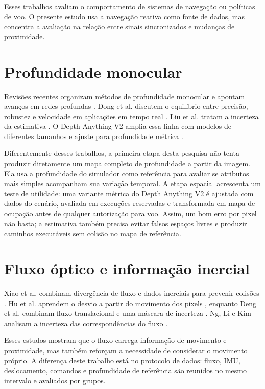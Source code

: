 Esses trabalhos avaliam o comportamento de sistemas de navegação ou políticas de voo. O presente estudo usa a navegação reativa como fonte de dados, mas concentra a avaliação na relação entre sinais sincronizados e mudanças de proximidade.

\section{Profundidade monocular}

Revisões recentes organizam métodos de profundidade monocular e apontam avanços em redes profundas \cite{Vyas2022,Arampatzakis2024,Dhanushkodi2025}. Dong et al. discutem o equilíbrio entre precisão, robustez e velocidade em aplicações em tempo real \cite{RealTimeMonocular2022}. Liu et al. tratam a incerteza da estimativa \cite{Liu2023}. O Depth Anything V2 amplia essa linha com modelos de diferentes tamanhos e ajuste para profundidade métrica \cite{DepthAnythingV2}.

Diferentemente desses trabalhos, a primeira etapa desta pesquisa não tenta produzir diretamente um mapa completo de profundidade a partir da imagem. Ela usa a profundidade do simulador como referência para avaliar se atributos mais simples acompanham sua variação temporal. A etapa espacial acrescenta um teste de utilidade: uma variante métrica do Depth Anything V2 é ajustada com dados do cenário, avaliada em execuções reservadas e transformada em mapa de ocupação antes de qualquer autorização para voo. Assim, um bom erro por pixel não basta; a estimativa também precisa evitar falsos espaços livres e produzir caminhos executáveis sem colisão no mapa de referência.

\section{Fluxo óptico e informação inercial}

Xiao et al. combinam divergência de fluxo e dados inerciais para prevenir colisões \cite{Xiao2021}. Hu et al. aprendem o desvio a partir do movimento dos pixels \cite{PixelMotion2025}, enquanto Deng et al. combinam fluxo translacional e uma máscara de incerteza \cite{Deng2026}. Ng, Li e Kim analisam a incerteza das correspondências do fluxo \cite{Estimation2109}.

Esses estudos mostram que o fluxo carrega informação de movimento e proximidade, mas também reforçam a necessidade de considerar o movimento próprio. A diferença deste trabalho está no protocolo de dados: fluxo, IMU, deslocamento, comandos e profundidade de referência são reunidos no mesmo intervalo e avaliados por grupos.

